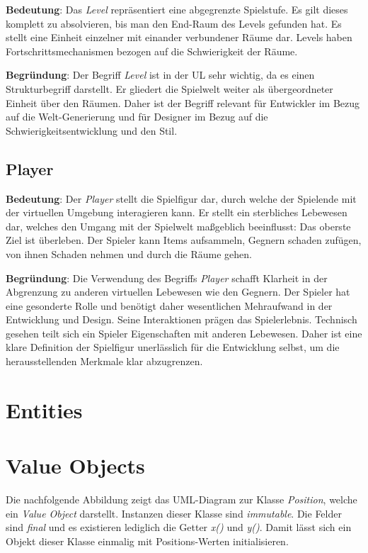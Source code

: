 \textbf{Bedeutung}: Das \textit{Level} repräsentiert eine abgegrenzte
Spielstufe. Es gilt dieses komplett zu absolvieren, bis man den
End-Raum des Levels gefunden hat. Es stellt eine Einheit einzelner mit
einander verbundener Räume dar. Levels haben Fortschrittsmechanismen
bezogen auf die Schwierigkeit der Räume.

\textbf{Begründung}: Der Begriff \textit{Level} ist in der UL sehr
wichtig, da es einen Strukturbegriff darstellt. Er gliedert die
Spielwelt weiter als übergeordneter Einheit über den Räumen. Daher
ist der Begriff relevant für Entwickler im Bezug auf die Welt-Generierung
und für Designer im Bezug auf die Schwierigkeitsentwicklung und den
Stil.



\subsection*{Player}

\textbf{Bedeutung}: Der \textit{Player} stellt die Spielfigur dar,
durch welche der Spielende mit der virtuellen Umgebung interagieren
kann. Er stellt ein sterbliches Lebewesen dar, welches den Umgang mit
der Spielwelt maßgeblich beeinflusst: Das oberste Ziel ist überleben.
Der Spieler kann Items aufsammeln, Gegnern schaden zufügen, von ihnen
Schaden nehmen und durch die Räume gehen.

\textbf{Begründung}: Die Verwendung des Begriffs \textit{Player}
schafft Klarheit in der Abgrenzung zu anderen virtuellen Lebewesen
wie den Gegnern. Der Spieler hat eine gesonderte Rolle und benötigt
daher wesentlichen Mehraufwand in der Entwicklung und Design. Seine
Interaktionen prägen das Spielerlebnis. Technisch gesehen teilt sich
ein Spieler Eigenschaften mit anderen Lebewesen. Daher ist eine klare
Definition der Spielfigur unerlässlich für die Entwicklung selbst, um
die herausstellenden Merkmale klar abzugrenzen.

\section{Entities}

\section{Value Objects}
Die nachfolgende Abbildung zeigt das UML-Diagram zur Klasse
\textit{Position}, welche ein \textit{Value Object} darstellt.
Instanzen dieser Klasse sind \textit{immutable}. Die Felder sind
\textit{final} und es existieren lediglich die Getter \textit{x()}
und \textit{y()}. Damit lässt sich ein Objekt dieser Klasse einmalig
mit Positions-Werten initialisieren. 

